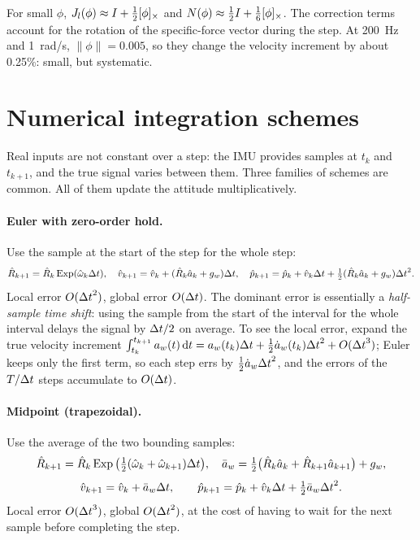 For small $\phi$, $J_l(\phi) \approx I + \tfrac12[\phi]_{\times}$ and $N(\phi) \approx \tfrac12 I + \tfrac16[\phi]_{\times}$. The
correction terms account for the rotation of the specific-force vector during the step. At 200~Hz and
1~rad/s, $\|\phi\| = 0.005$, so they change the velocity increment by about 0.25\%: small, but systematic.

\section{Numerical integration schemes}

Real inputs are not constant over a step: the IMU provides samples at $t_k$ and $t_{k+1}$, and the true signal
varies between them. Three families of schemes are common. All of them update the attitude
multiplicatively.

\paragraph{Euler with zero-order hold.} Use the sample at the start of the step for the whole step:
\begin{equation}
  \hat R_{k+1} = \hat R_k\operatorname{Exp}(\hat\omega_k{\Delta t}), \quad
  \hat v_{k+1} = \hat v_k + (\hat R_k\hat a_k + g_w){\Delta t}, \quad
  \hat p_{k+1} = \hat p_k + \hat v_k{\Delta t} + \tfrac12(\hat R_k\hat a_k + g_w){\Delta t}^2 .
\end{equation}
Local error $O({\Delta t}^2)$, global error $O({\Delta t})$. The dominant error is essentially a \emph{half-sample time
shift}: using the sample from the start of the interval for the whole interval delays the signal by
${\Delta t}/2$ on average. To see the local error, expand the true velocity increment $\int_{t_k}^{t_{k+1}}a_w(t)\,\mathrm{d} t = a_w(t_k){\Delta t} + \tfrac12\dot a_w(t_k){\Delta t}^2 + O({\Delta t}^3)$; Euler keeps
only the first term, so each step errs by $\tfrac12\dot a_w{\Delta t}^2$, and the errors of the $T/{\Delta t}$ steps accumulate to $O({\Delta t})$.

\paragraph{Midpoint (trapezoidal).} Use the average of the two bounding samples:
\begin{equation}
  \hat R_{k+1} = \hat R_k\operatorname{Exp}\big(\tfrac12(\hat\omega_k + \hat\omega_{k+1}){\Delta t}\big),\quad
  \bar a_w = \tfrac12\big(\hat R_k\hat a_k + \hat R_{k+1}\hat a_{k+1}\big) + g_w,
\end{equation}
\begin{equation*}
  \hat v_{k+1} = \hat v_k + \bar a_w{\Delta t}, \qquad \hat p_{k+1} = \hat p_k + \hat v_k{\Delta t} + \tfrac12\bar a_w{\Delta t}^2 .
\end{equation*}
Local error $O({\Delta t}^3)$, global $O({\Delta t}^2)$, at the cost of having to wait for the next sample before
completing the step.

